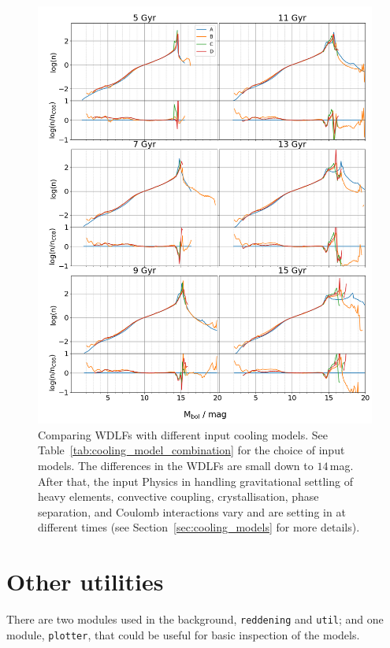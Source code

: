 \documentclass[fleqn,usenatbib]{rasti}
\begin{document}
\begin{figure}
    \centering
    \includegraphics[width=\textwidth]{wdlf_compare_da_cooling_models.png}
    \caption{Comparing WDLFs with different input cooling models. See
    Table~\ref{tab:cooling_model_combination} for the choice of input models.
    The differences in the WDLFs are small down to $14$\,mag. After that, the
    input Physics in handling gravitational settling of heavy elements,
    convective coupling, crystallisation, phase separation, and Coulomb
    interactions vary and are setting in at different times (see
    Section~\ref{sec:cooling_models} for more details).
    }
    \label{fig:wdlf_compare_da_cooling_models}
\end{figure}


\section{Other utilities}
There are two modules used in the background, \texttt{reddening} and
\texttt{util}; and one module, \texttt{plotter}, that could be useful for
basic inspection of the models. 
\end{document}
